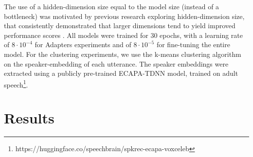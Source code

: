 The use of a hidden-dimension size equal to the model size (instead of a bottleneck) was motivated by previous research exploring hidden-dimension size, that consistently demonstrated that larger dimensions tend to yield improved performance scores \cite{chen2023efficient}.
All models were trained for 30 epochs, with a learning rate of $8\cdot10^{-4}$ for Adapters experiments and of $8\cdot10^{-5}$ for fine-tuning the entire model.
For the clustering experiments, we use the k-means clustering algorithm on the speaker-embedding of each utterance. The speaker embeddings were extracted using a publicly pre-trained ECAPA-TDNN model, trained on adult speech\footnote{https://huggingface.co/speechbrain/spkrec-ecapa-voxceleb}.

\section{Results}
\label{sec:results}

